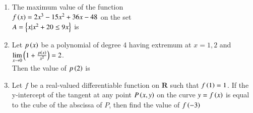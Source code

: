 \documentclass[journal,,12pt,onecolumn]{IEEEtran}
\theoremstyle{remark}
\begin{document}
\begin{enumerate}
\item The maximum value of the function \\
$f\left(x\right)=2x^3-15x^2+36x-48$ on the set\\
$A=\left\{x|x^2+20 \le 9x\right\}$ is

\hfill {}

\item Let $p\left(x\right)$ be a polynomial of degree 4 having extremum at $x=1,2 $ and $\lim \limits_{x\to 0} \left(1+\frac{p\left(x\right)}{x^2}\right) = 2$.\\
Then the value of $p\left(2\right)$ is
\hfill {}
\item Let $f$ be a real-valued differentiable function on $\textbf{R}$ such that $f\left(1\right)=1$. If the y-intercept of the tangent at any point $P\left(x,y\right)$ on the curve $y=f\left(x\right)$ is equal to the cube of the abscissa of $P$, then find the value of $f\left(-3\right)$

    \hfill {}


\end{enumerate}
\end{document}
